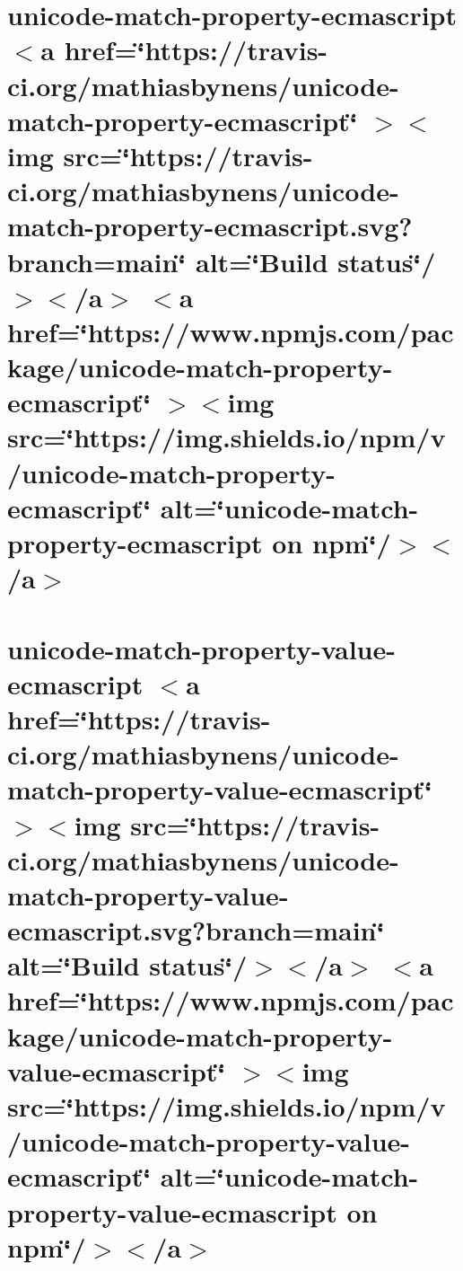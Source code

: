 \documentclass[twoside]{book}
\newcommand{\+}{\discretionary{\mbox{\scriptsize$\hookleftarrow$}}{}{}}
\begin{document}
\chapter{unicode-\/match-\/property-\/ecmascript \texorpdfstring{$<$}{<}a href=\char`\"{}https\+://travis-\/ci.\+org/mathiasbynens/unicode-\/match-\/property-\/ecmascript\char`\"{} \texorpdfstring{$>$}{>}\texorpdfstring{$<$}{<}img src=\char`\"{}https\+://travis-\/ci.\+org/mathiasbynens/unicode-\/match-\/property-\/ecmascript.\+svg?branch=main\char`\"{} alt=\char`\"{}\+Build status\char`\"{}/\texorpdfstring{$>$}{>}\texorpdfstring{$<$}{<}/a\texorpdfstring{$>$}{>} \texorpdfstring{$<$}{<}a href=\char`\"{}https\+://www.\+npmjs.\+com/package/unicode-\/match-\/property-\/ecmascript\char`\"{} \texorpdfstring{$>$}{>}\texorpdfstring{$<$}{<}img src=\char`\"{}https\+://img.\+shields.\+io/npm/v/unicode-\/match-\/property-\/ecmascript\char`\"{} alt=\char`\"{}unicode-\/match-\/property-\/ecmascript on npm\char`\"{}/\texorpdfstring{$>$}{>}\texorpdfstring{$<$}{<}/a\texorpdfstring{$>$}{>}}
\label{md__c___users_vaishnavi_jadhav__desktop__developer_code_mean_stack_example_client_node_modules_u08191ea794e1925820bfabaf3e6506db}

\chapter{unicode-\/match-\/property-\/value-\/ecmascript \texorpdfstring{$<$}{<}a href=\char`\"{}https\+://travis-\/ci.\+org/mathiasbynens/unicode-\/match-\/property-\/value-\/ecmascript\char`\"{} \texorpdfstring{$>$}{>}\texorpdfstring{$<$}{<}img src=\char`\"{}https\+://travis-\/ci.\+org/mathiasbynens/unicode-\/match-\/property-\/value-\/ecmascript.\+svg?branch=main\char`\"{} alt=\char`\"{}\+Build status\char`\"{}/\texorpdfstring{$>$}{>}\texorpdfstring{$<$}{<}/a\texorpdfstring{$>$}{>} \texorpdfstring{$<$}{<}a href=\char`\"{}https\+://www.\+npmjs.\+com/package/unicode-\/match-\/property-\/value-\/ecmascript\char`\"{} \texorpdfstring{$>$}{>}\texorpdfstring{$<$}{<}img src=\char`\"{}https\+://img.\+shields.\+io/npm/v/unicode-\/match-\/property-\/value-\/ecmascript\char`\"{} alt=\char`\"{}unicode-\/match-\/property-\/value-\/ecmascript on npm\char`\"{}/\texorpdfstring{$>$}{>}\texorpdfstring{$<$}{<}/a\texorpdfstring{$>$}{>}}
\label{md__c___users_vaishnavi_jadhav__desktop__developer_code_mean_stack_example_client_node_modules_uc5fe79456169966b873fbdf617aa5652}

\end{document}
